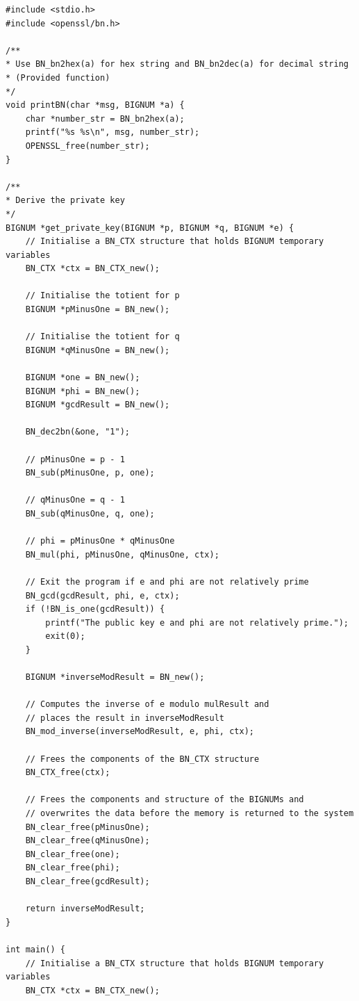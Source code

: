 \documentclass[12pt]{article}
\begin{document}
\begin{lstlisting}
#include <stdio.h>
#include <openssl/bn.h>

/**
* Use BN_bn2hex(a) for hex string and BN_bn2dec(a) for decimal string
* (Provided function)
*/
void printBN(char *msg, BIGNUM *a) {
    char *number_str = BN_bn2hex(a);
    printf("%s %s\n", msg, number_str);
    OPENSSL_free(number_str);
}

/**
* Derive the private key
*/ 
BIGNUM *get_private_key(BIGNUM *p, BIGNUM *q, BIGNUM *e) {
    // Initialise a BN_CTX structure that holds BIGNUM temporary variables
    BN_CTX *ctx = BN_CTX_new();

    // Initialise the totient for p
    BIGNUM *pMinusOne = BN_new();

    // Initialise the totient for q
    BIGNUM *qMinusOne = BN_new();

    BIGNUM *one = BN_new();
    BIGNUM *phi = BN_new();
    BIGNUM *gcdResult = BN_new();

    BN_dec2bn(&one, "1");

    // pMinusOne = p - 1
    BN_sub(pMinusOne, p, one);

    // qMinusOne = q - 1
    BN_sub(qMinusOne, q, one);

    // phi = pMinusOne * qMinusOne
    BN_mul(phi, pMinusOne, qMinusOne, ctx);

    // Exit the program if e and phi are not relatively prime
    BN_gcd(gcdResult, phi, e, ctx);
    if (!BN_is_one(gcdResult)) {
        printf("The public key e and phi are not relatively prime.");
        exit(0);
    }

    BIGNUM *inverseModResult = BN_new();
    
    // Computes the inverse of e modulo mulResult and 
    // places the result in inverseModResult
    BN_mod_inverse(inverseModResult, e, phi, ctx);

    // Frees the components of the BN_CTX structure
    BN_CTX_free(ctx);

    // Frees the components and structure of the BIGNUMs and
    // overwrites the data before the memory is returned to the system
    BN_clear_free(pMinusOne);
    BN_clear_free(qMinusOne);
    BN_clear_free(one);
    BN_clear_free(phi);
    BN_clear_free(gcdResult);

    return inverseModResult;
}

int main() {
    // Initialise a BN_CTX structure that holds BIGNUM temporary variables
    BN_CTX *ctx = BN_CTX_new();


\end{lstlisting}
\end{document}
